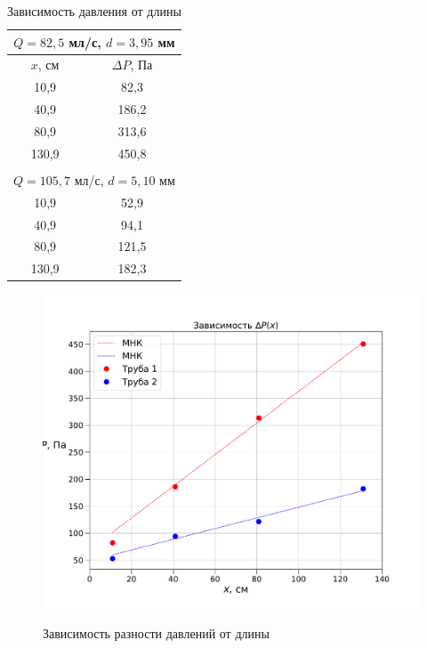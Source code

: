 \documentclass[a4paper,12pt]{article} %
\begin{document}
\begin{table}[H]
    \centering
    \begin{tabular}{|c|c|}
        \hline \multicolumn{2}{|c|}{$Q=82,5$ мл/с, $d=3,95$ мм} \\ \hline
        $x$, см & $\Delta P$, Па \\ \hline
        10,9 &  82,3 \\ \hline
        40,9 &  186,2 \\ \hline
        80,9 &  313,6 \\ \hline
        130,9 & 450,8 \\ \hline
        \multicolumn{2}{c}{} \\
        \hline \multicolumn{2}{|c|}{$Q=105,7$ мл/с, $d=5,10$ мм} \\ \hline
        10,9 &  52,9 \\ \hline
        40,9 &  94,1 \\ \hline
        80,9 &  121,5 \\ \hline
        130,9 & 182,3 \\ \hline
    \end{tabular}
    \caption{Зависимость давления от длины}
    \label{p1}

\end{table}

\begin{figure}[H]
    \centering
    \includegraphics[scale=0.65]{p(x).pdf}
    \label{p(x)}
    \caption{Зависимость разности давлений от длины}
\end{figure}
\end{document}
